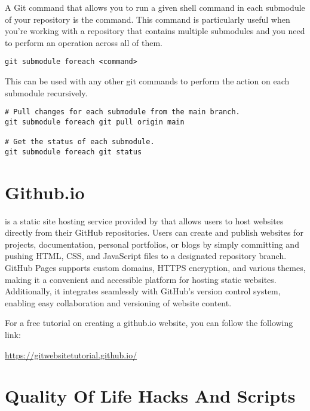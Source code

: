 A Git command that allows you to run a given shell command in each submodule of your repository is the  command. This command is particularly useful when you're working with a repository that contains multiple submodules and you need to perform an operation across all of them.
\begin{lstlisting}[style=terminalstyle]
git submodule foreach <command>
\end{lstlisting}

This can be used with any other git commands to perform the action on each submodule recursively.
\begin{lstlisting}[style=terminalstyle]
# Pull changes for each submodule from the main branch.
git submodule foreach git pull origin main

# Get the status of each submodule.
git submodule foreach git status
\end{lstlisting}






\section{Github.io}

 is a static site hosting service provided by  that allows users to host websites directly from their GitHub repositories. Users can create and publish websites for projects, documentation, personal portfolios, or blogs by simply committing and pushing HTML, CSS, and JavaScript files to a designated repository branch. GitHub Pages supports custom domains, HTTPS encryption, and various themes, making it a convenient and accessible platform for hosting static websites. Additionally, it integrates seamlessly with GitHub's version control system, enabling easy collaboration and versioning of website content.

\begin{urlbox}
For a free tutorial on creating a github.io website, you can follow the following link:

\url{https://gitwebsitetutorial.github.io/}
\end{urlbox}









 \section{Quality Of Life Hacks And Scripts}
 
